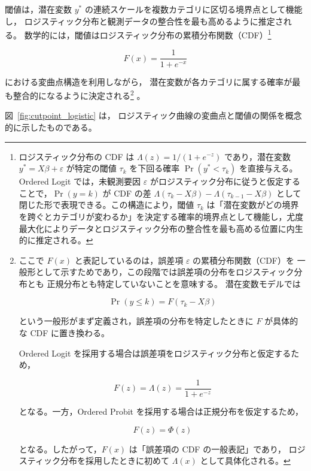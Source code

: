 閾値は，潜在変数 $y^*$ の連続スケールを複数カテゴリに区切る境界点として機能し，
ロジスティック分布と観測データの整合性を最も高めるように推定される。
数学的には，閾値はロジスティック分布の累積分布関数（CDF）\footnote{
ロジスティック分布の CDF は $\Lambda(z)=1/(1+e^{-z})$ であり，潜在変数 $y^*=X\beta+\varepsilon$ が特定の閾値 $\tau_k$ を下回る確率 $\Pr(y^*<\tau_k)$ を直接与える。Ordered Logit では，未観測要因 $\varepsilon$ がロジスティック分布に従うと仮定することで，$\Pr(y=k)$ が CDF の差 $\Lambda(\tau_k - X\beta)-\Lambda(\tau_{k-1}-X\beta)$ として閉じた形で表現できる。この構造により，閾値 $\tau_k$ は「潜在変数がどの境界を跨ぐとカテゴリが変わるか」を決定する確率的境界点として機能し，尤度最大化によりデータとロジスティック分布の整合性を最も高める位置に内生的に推定される。} 




\[
F(x)=\frac{1}{1+e^{-x}}
\]



における変曲点構造を利用しながら，
潜在変数が各カテゴリに属する確率が最も整合的になるように決定される\footnote{
ここで $F(x)$ と表記しているのは，誤差項 $\varepsilon$ の累積分布関数（CDF）を
一般形として示すためであり，この段階では誤差項の分布をロジスティック分布とも
正規分布とも特定していないことを意味する。
潜在変数モデルでは


\[
\Pr(y \le k)=F(\tau_k - X\beta)
\]


という一般形がまず定義され，誤差項の分布を特定したときに
$F$ が具体的な CDF に置き換わる。

Ordered Logit を採用する場合は誤差項をロジスティック分布と仮定するため，


\[
F(z)=\Lambda(z)=\frac{1}{1+e^{-z}}
\]


となる。一方，Ordered Probit を採用する場合は正規分布を仮定するため，


\[
F(z)=\Phi(z)
\]


となる。したがって，$F(x)$ は「誤差項の CDF の一般表記」であり，
ロジスティック分布を採用したときに初めて $\Lambda(x)$ として具体化される。
}
。

図~\ref{fig:cutpoint_logistic} は，
ロジスティック曲線の変曲点と閾値の関係を概念的に示したものである。

